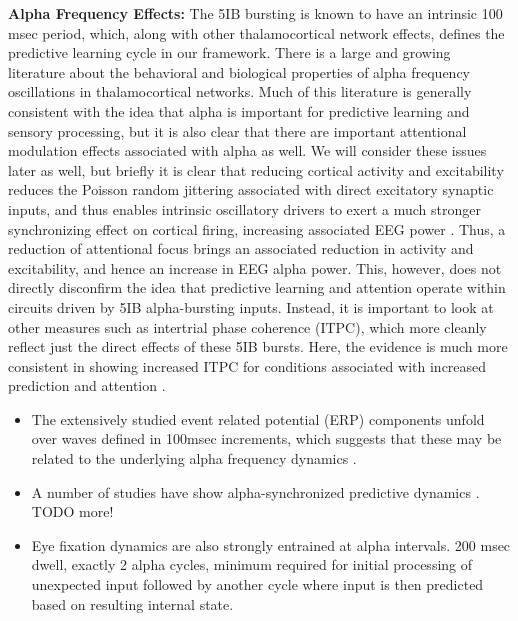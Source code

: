 \documentclass[11pt,twoside]{article}
\newif\myifpdf
\begin{document}
{\bf Alpha Frequency Effects:} The 5IB bursting is known to have an intrinsic 100 msec period, which, along with other thalamocortical network effects, defines the predictive learning cycle in our framework.  There is a large and growing literature about the behavioral and biological properties of alpha frequency oscillations in thalamocortical networks.  Much of this literature is generally consistent with the idea that alpha is important for predictive learning and sensory processing, but it is also clear that there are important attentional modulation effects associated with alpha as well.  We will consider these issues later as well, but briefly it is clear that reducing cortical activity and excitability reduces the Poisson random jittering associated with direct excitatory synaptic inputs, and thus enables intrinsic oscillatory drivers to exert a much stronger synchronizing effect on cortical firing, increasing associated EEG power \cite{ZhouSchaferDesimone16,KlimeschSausengHanslmayr07,JensenMazaheri10}.  Thus, a reduction of attentional focus brings an associated reduction in activity and excitability, and hence an increase in EEG alpha power.  This, however, does not directly disconfirm the idea that predictive learning and attention operate within circuits driven by 5IB alpha-bursting inputs.  Instead, it is important to look at other measures such as intertrial phase coherence (ITPC), which more cleanly reflect just the direct effects of these 5IB bursts.  Here, the evidence is much more consistent in showing increased ITPC for conditions associated with increased prediction and attention \cite{MaryPapers,MayerSchwiedrzikWibralEtAl16}.

\begin{itemize}
	\item The extensively studied event related potential (ERP) components unfold over waves defined in 100msec increments, which suggests that these may be related to the underlying alpha frequency dynamics \cite{MakeigWesterfieldJungEtAl02,GruberKlimeschSausengEtAl05,Klimesch11}.
	\item A number of studies have show alpha-synchronized predictive dynamics \cite{MayerSchwiedrzikWibralEtAl16}.  TODO more!
	\item Eye fixation dynamics are also strongly entrained at alpha intervals.  200 msec dwell, exactly 2 alpha cycles, minimum required for initial processing of unexpected input followed by another cycle where input is then predicted based on resulting internal state.
\end{itemize}
\end{document}
